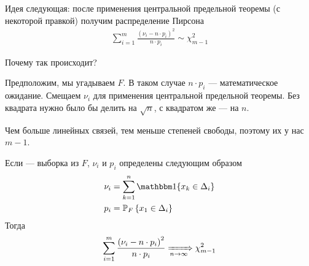 Идея следующая: после применения центральной предельной теоремы (с некоторой
правкой) получим распределение Пирсона
\begin{align*}
  \sum_{i=1}^{m}\frac{\left( \nu_i - n \cdot p_i \right)^2}{n \cdot p_i}
  \sim \chi_{m-1}^2
\end{align*}

Почему так происходит?

Предположим, мы угадываем $F$. В таком случае $n \cdot p_i$ --- математическое
ожидание. Смещаем $\nu_i$ для применения центральной предельной теоремы.
Без квадрата нужно было бы делить на $\sqrt{n}$, с квадратом же --- на $n$.

Чем больше линейных связей, тем меньше степеней свободы, поэтому их у нас $m-1$.

\begin{theorem}
  Если \xsample --- выборка из $F$, $\nu_i$ и $p_i$ определены
  следующим образом
  \begin{align*}
      \nu_i &= \sum_{k=1}^{n}\Indicator{x_k \in \Delta_i} \\
      p_i &= \Probability[F]{x_1 \in \Delta_i}
  \end{align*}
  Тогда
  \begin{align*}
      \sum_{i=1}^{m}\frac{\left( \nu_i - n \cdot p_i \right)^2}{n \cdot p_i}
      \xRightarrow[n\to\infty]{} \chi_{m-1}^2
  \end{align*}
\end{theorem}
